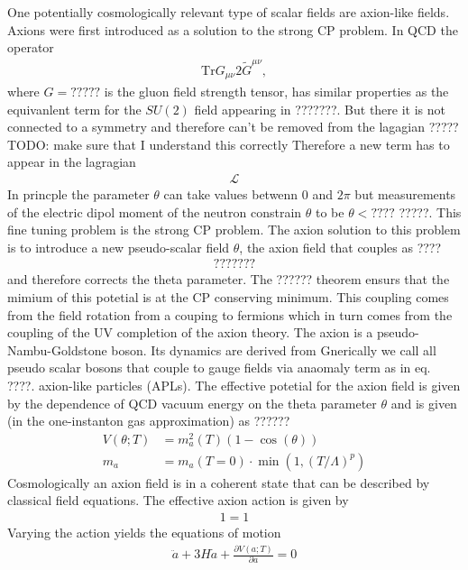 \documentclass[13pt,a4paper,twoside,titlepage]{article}
\begin{document}
One potentially cosmologically relevant type of scalar fields are axion-like fields.
Axions were first introduced as a solution to the strong CP problem.
In QCD the operator
\begin{align}
    \mathrm{Tr} G_{\mu \nu} 2\tilde{G}^{\mu \nu},
\end{align}
where $G = ?????$ is the gluon field strength tensor,
has similar properties as the equivanlent term for the $SU(2)$ field appearing
in ???????. But there it is not connected to a symmetry and therefore can't
be removed from the lagagian ????? TODO: make sure that I understand this correctly
Therefore a new term has to appear in the lagragian
\begin{align}
    \mathcal{L}
\end{align}
In princple the parameter $\theta$ can take values betwenn 0 and $2\pi$ but measurements of the electric dipol moment of the neutron constrain $\theta$ to
be $\theta < ????$ ?????.
This fine tuning problem is the strong CP problem.
The axion solution to this problem is to introduce a new pseudo-scalar field
$\theta$, the axion field that couples as ????
\begin{align}
    ???????
\end{align}
and therefore corrects the theta parameter. The ?????? theorem ensurs that
the mimium of this potetial is at the CP conserving minimum.
This coupling comes from the field rotation from a couping to fermions which in turn comes from
the coupling of the UV completion of the axion theory.
The axion is a pseudo-Nambu-Goldstone boson. Its dynamics are derived from
Gnerically we call all pseudo scalar bosons that couple to gauge fields via anaomaly term as in eq. ????.
axion-like particles (APLs).
The effective potetial for the axion field is given by the dependence of QCD vacuum energy
on the theta parameter $\theta$ and is given (in the one-instanton gas approximation) as ??????
\begin{align}
    V(\theta; T) &= m_a^2(T) (1 - \cos(\theta)) \\
    m_a &= m_a(T = 0) \cdot \min\left(1, \left( T / \Lambda \right)^p \right)
\end{align}
Cosmologically an axion field is in a coherent state that can be described by classical field equations.
The effective axion action is given by
\begin{align}
    1 = 1
\end{align}
Varying the action yields the equations of motion
\begin{align}
    \ddot{a} + 3 H \dot{a} + \frac{\partial V(a; T)}{\partial a} = 0
\end{align}
\end{document}
